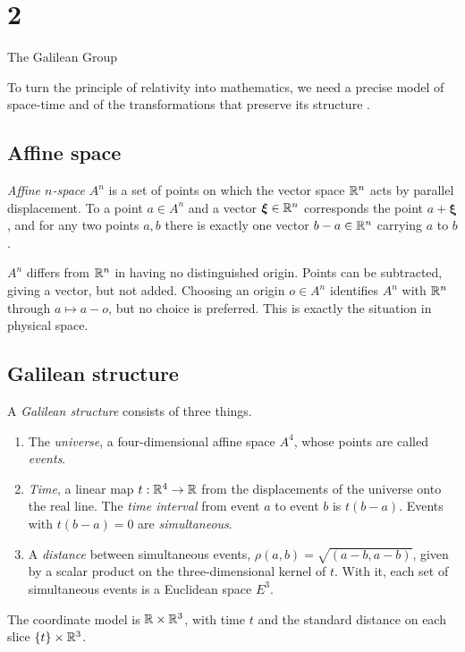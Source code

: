 \chapter{2}{The Galilean Group}

To turn the principle of relativity into mathematics, we need a precise
model of space-time and of the transformations that preserve its
structure \cite[ch.~1]{arnold}.

\section{Affine space}\label{sec:affine}

\begin{definition}\label{def:affine}
  \emph{Affine $n$-space} $A^n$ is a set of points on which the vector space
  $\mathbb{R}^n$ acts by parallel displacement. To a point $a \in A^n$ and a vector
  $\boldsymbol\xi \in \mathbb{R}^n$ corresponds the point $a + \boldsymbol\xi$, and
  for any two points $a, b$ there is exactly one vector
  $b - a \in \mathbb{R}^n$ carrying $a$ to $b$.
\end{definition}

\begin{remark}
  $A^n$ differs from $\mathbb{R}^n$ in having no distinguished origin. Points can be
  subtracted, giving a vector, but not added. Choosing an origin
  $o \in A^n$ identifies $A^n$ with $\mathbb{R}^n$ through $a \mapsto a - o$, but no
  choice is preferred. This is exactly the situation in physical space.
\end{remark}

\section{Galilean structure}\label{sec:galilean-structure}

\begin{definition}\label{def:galilean-structure}
  A \emph{Galilean structure} consists of three things.
  \begin{enumerate}
    \item The \emph{universe}, a four-dimensional affine space $A^4$, whose
      points are called \emph{events}.
    \item \emph{Time}, a linear map $t : \mathbb{R}^4 \to \mathbb{R}$ from the displacements
      of the universe onto the real line. The \emph{time interval} from event
      $a$ to event $b$ is $t(b - a)$. Events with $t(b - a) = 0$ are
      \emph{simultaneous}.
    \item A \emph{distance} between simultaneous events,
      $\rho(a, b) = \sqrt{(a - b, a - b)}$, given by a scalar product on the
      three-dimensional kernel of $t$. With it, each set of simultaneous
      events is a Euclidean space $E^3$.
  \end{enumerate}
  The coordinate model is $\mathbb{R} \times \mathbb{R}^3$, with time $t$ and the standard
  distance on each slice $\{t\} \times \mathbb{R}^3$.
\end{definition}

